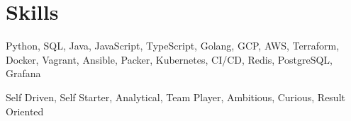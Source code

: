 \section{Skills}
\begin{description}
  \footnotesize{
  \item[Technical] Python, SQL, Java, JavaScript, TypeScript, Golang, GCP, AWS, Terraform, Docker, Vagrant, Ansible, Packer, Kubernetes, CI/CD, Redis, PostgreSQL, Grafana
  \item[People]
    Self Driven, Self Starter, Analytical, Team Player, Ambitious, Curious, Result Oriented
  }
\end{description}
